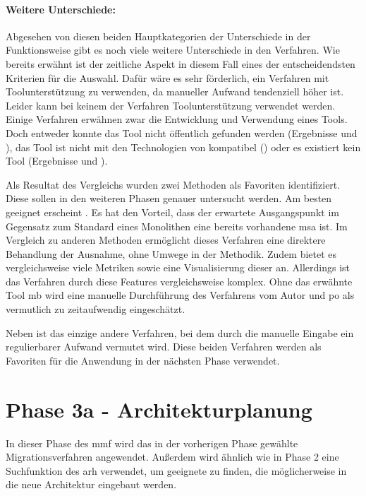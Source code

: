 \paragraph{Weitere Unterschiede:} Abgesehen von diesen beiden Hauptkategorien der Unterschiede in der Funktionsweise gibt es noch viele weitere Unterschiede in den Verfahren.
Wie bereits erwähnt ist der zeitliche Aspekt in diesem Fall eines der entscheidendsten Kriterien für die Auswahl.
Dafür wäre es sehr förderlich, ein Verfahren mit Toolunterstützung zu verwenden, da manueller Aufwand tendenziell höher ist.
Leider kann bei keinem der Verfahren Toolunterstützung verwendet werden.
Einige Verfahren erwähnen zwar die Entwicklung und Verwendung eines Tools.
Doch entweder konnte das Tool nicht öffentlich gefunden werden (Ergebnisse  und ), das Tool ist nicht mit den Technologien von \jf kompatibel () oder es existiert kein Tool (Ergebnisse  und ).

Als Resultat des Vergleichs wurden zwei Methoden als Favoriten identifiziert.
Diese sollen in den weiteren Phasen genauer untersucht werden.
Am besten geeignet erscheint . 
Es hat den Vorteil, dass der erwartete Aus\-gangs\-punkt im Gegensatz zum Standard eines Monolithen eine bereits vorhandene \gls{msa} ist.
Im Vergleich zu anderen Methoden ermöglicht dieses Verfahren eine direktere Behandlung der Ausnahme, ohne Umwege in der Methodik.
Zudem bietet es vergleichsweise viele Metriken sowie eine Visualisierung dieser an.
Allerdings ist das Verfahren durch diese Features vergleichsweise komplex.
Ohne das erwähnte Tool \gls{mb} wird eine manuelle Durchführung des Verfahrens vom Autor und \gls{po} als vermutlich zu zeitaufwendig eingeschätzt.

Neben  ist  das einzige andere Verfahren, bei dem durch die manuelle Eingabe ein regulierbarer Aufwand vermutet wird.
Diese beiden Verfahren werden als Favoriten für die Anwendung in der nächsten Phase verwendet.

\section{Phase 3a - Architekturplanung}
\label{sec:durchführung-phase3}

In dieser Phase des \acrfull{mmf} wird das in der vorherigen Phase gewählte Migrationsverfahren angewendet.
Außerdem wird ähnlich wie in Phase 2 eine Suchfunktion des \gls{arh} verwendet, um geeignete \bpp zu finden, die möglicherweise in die neue Architektur eingebaut werden.

